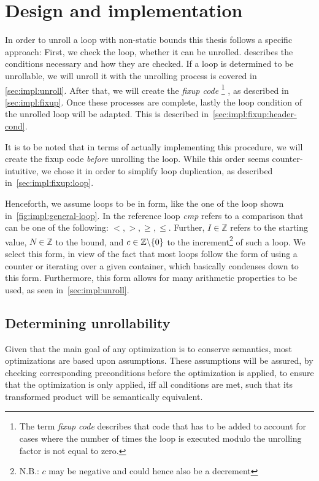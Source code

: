 \chapter{Design and implementation}\label{sec:impl}

In order to unroll a loop with non-static bounds this thesis follows a specific approach:
First, we check the loop, whether it can be unrolled.
 describes the conditions necessary and how they are checked.
If a loop is determined to be unrollable, we will unroll it with the unrolling process is covered in \cref{sec:impl:unroll}.
After that, we will create the \textit{fixup code}
\footnote{The term \textit{fixup code} describes that code that has to be added to account for cases where the number of times the loop is executed modulo the unrolling factor is not equal to zero.}
, as described in \cref{sec:impl:fixup}.
Once these processes are complete, lastly the loop condition of the unrolled loop will be adapted.
This is described in~\cref{sec:impl:fixup:header-cond}.

It is to be noted that in terms of actually implementing this procedure, we will create the fixup code \textit{before} unrolling the loop.
While this order seems counter-intuitive, we chose it in order to simplify loop duplication, as described in~\cref{sec:impl:fixup:loop}.


Henceforth, we assume loops to be in form, like the one of the loop shown in~\cref{fig:impl:general-loop}.
In the reference loop \textit{cmp} refers to a comparison that can be one of the following: $<, >, \geq, \leq$.
Further, $I \in \mathbb{Z}$ refers to the starting value, $N \in \mathbb{Z}$ to the bound, and $c \in \mathbb{Z} \backslash \{0\}$ \label{sec:impl::def-c} to the increment\footnote{N.B.: $c$ may be negative and could hence also be a decrement} of such a loop.
We select this form, in view of the fact that most loops follow the form of using a counter or iterating over a given container, which basically condenses down to this form.
Furthermore, this form allows for many arithmetic properties to be used, as seen in~\cref{sec:impl:unroll}.



\section{Determining unrollability}\label{sec:impl:unrollability}

Given that the main goal of any optimization is to conserve semantics, most optimizations are based upon assumptions.
These assumptions will be assured, by checking corresponding preconditions before the optimization is applied, to ensure that the optimization is only applied, iff all conditions are met, such that its transformed product will be semantically equivalent.

